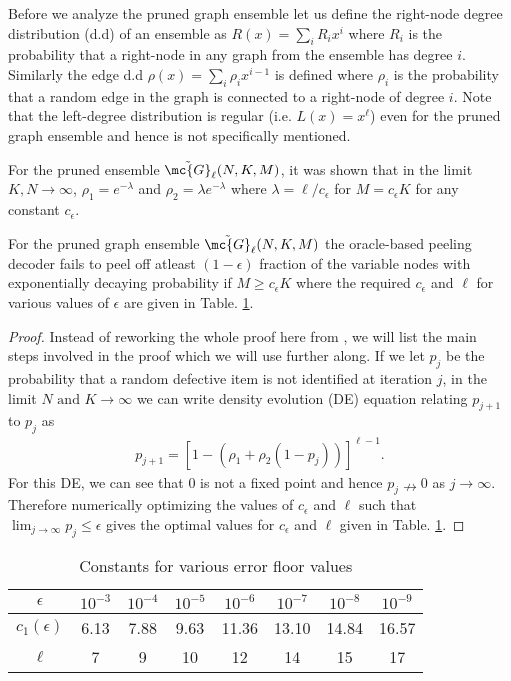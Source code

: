 \documentclass[conference,twocolumn]{IEEEtran}
\def\ceps{c_{\epsilon}}
\begin{document}
Before we analyze the pruned graph ensemble let us define the right-node degree distribution (d.d) of an ensemble as $R(x)=\sum_{i}R_i x^i$ where $R_i$ is the probability that a right-node in any graph from the ensemble has degree $i$. Similarly the edge d.d $\rho(x)=\sum_{i}\rho_ix^{i-1}$ is defined where $\rho_i$ is the probability that a random edge in the graph is connected to a right-node of degree $i$. Note that the left-degree distribution is regular (i.e. $L(x)=x^\ell$) even for the pruned graph ensemble and hence is not specifically mentioned.

\begin{lemma}
For the pruned ensemble $\tilde{\mc{G}}_{\ell}(N,K,M)$, it was shown that in the limit $K,N\rightarrow\infty$, $\rho_{1}=e^{-\lambda}$ and $\rho_{2}=\lambda e^{-\lambda}$ where $\lambda=\ell/\ceps$ for $M=\ceps K$ for any constant $\ceps$. 
\end{lemma}

\begin{lemma}
\label{Lem:PeelingAnalysisLeftRegular}
For the pruned graph ensemble $\tilde{\mc{G}}_{\ell}(N, K,M)$ the oracle-based peeling decoder fails to peel off atleast $(1-\epsilon)$ fraction of the variable nodes with exponentially decaying probability if $M\geq \ceps K$ where the required $\ceps$ and $\ell$ for various values of $\epsilon$ are given in Table. \ref{Table:constantsDE}.
\end{lemma}
\begin{proof}
Instead of reworking the whole proof here from \cite{lee2015saffron}, we will list the main steps involved in the proof which we will use further along. If we let $p_j$ be the probability that a random defective item is not identified at iteration $j$, in the limit $N \text{ and } K\rightarrow \infty$ we can write density evolution (DE) equation relating $p_{j+1}$ to $p_{j}$ as 
\begin{align*}
p_{j+1}=\left[1-(\rho_1+\rho_2(1-p_j))\right]^{\ell-1}.
\end{align*}
For this DE, we can see that $0$ is not a fixed point and hence $p_j\nrightarrow 0$ as $j\rightarrow\infty$. Therefore numerically optimizing the values of $\ceps$ and $\ell$ such that $\lim_{j\rightarrow\infty}p_j\leq \epsilon$ gives the optimal values for $\ceps$ and $\ell$ given in Table. \ref{Table:constantsDE}.
\end{proof}

\begin{table}[t]
\centering
\begin{tabular}{| c | c | c | c | c | c | c | c | }
\hline
$\epsilon$ & $10^{-3}$ & $10^{-4}$ & $10^{-5}$ & $10^{-6}$ &$ 10^{-7}$ & $10^{-8}$ & $10^{-9}$ \\ \hline
$c_1(\epsilon)$ & 6.13 & 7.88 & 9.63 & 11.36 & 13.10 & 14.84 & 16.57 \\ \hline
 $\ell$ & 7 & 9 & 10 & 12 & 14 & 15 & 17 \\ \hline
\end{tabular}
\vspace{1ex}
\caption{Constants for various error floor values}
\label{Table:constantsDE}
\end{table}
\end{document}
